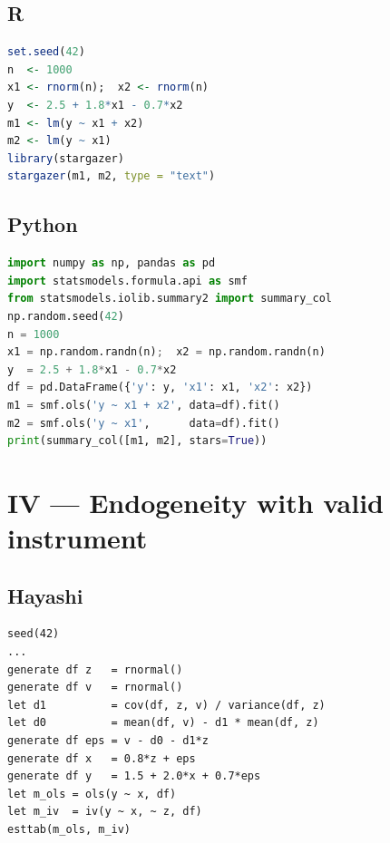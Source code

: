 \subsection*{R}

\begin{lstlisting}[language=R, basicstyle=\ttfamily\small,
  frame=single, numbers=none, backgroundcolor=\color{codbg},
  keywordstyle=\color{keyword}\bfseries,
  stringstyle=\color{string},
  commentstyle=\color{comment}\itshape]
set.seed(42)
n  <- 1000
x1 <- rnorm(n);  x2 <- rnorm(n)
y  <- 2.5 + 1.8*x1 - 0.7*x2
m1 <- lm(y ~ x1 + x2)
m2 <- lm(y ~ x1)
library(stargazer)
stargazer(m1, m2, type = "text")
\end{lstlisting}

\subsection*{Python}

\begin{lstlisting}[language=Python, basicstyle=\ttfamily\small,
  frame=single, numbers=none, backgroundcolor=\color{codbg},
  keywordstyle=\color{keyword}\bfseries,
  stringstyle=\color{string},
  commentstyle=\color{comment}\itshape]
import numpy as np, pandas as pd
import statsmodels.formula.api as smf
from statsmodels.iolib.summary2 import summary_col
np.random.seed(42)
n = 1000
x1 = np.random.randn(n);  x2 = np.random.randn(n)
y  = 2.5 + 1.8*x1 - 0.7*x2
df = pd.DataFrame({'y': y, 'x1': x1, 'x2': x2})
m1 = smf.ols('y ~ x1 + x2', data=df).fit()
m2 = smf.ols('y ~ x1',      data=df).fit()
print(summary_col([m1, m2], stars=True))
\end{lstlisting}

\section{IV — Endogeneity with valid instrument}

\subsection*{Hayashi}

\begin{lstlisting}
seed(42)
...
generate df z   = rnormal()
generate df v   = rnormal()
let d1          = cov(df, z, v) / variance(df, z)
let d0          = mean(df, v) - d1 * mean(df, z)
generate df eps = v - d0 - d1*z
generate df x   = 0.8*z + eps
generate df y   = 1.5 + 2.0*x + 0.7*eps
let m_ols = ols(y ~ x, df)
let m_iv  = iv(y ~ x, ~ z, df)
esttab(m_ols, m_iv)
\end{lstlisting}


